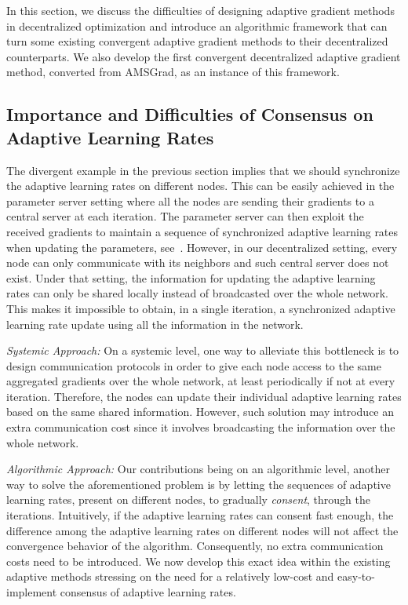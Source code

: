 \documentclass{article} %
\begin{document}
In this section, we discuss the difficulties of designing adaptive gradient methods in decentralized optimization and introduce an algorithmic framework that can turn some existing convergent adaptive gradient methods to their decentralized counterparts. 
We also develop the first convergent decentralized adaptive gradient method, converted from AMSGrad, as an instance of this  framework.

\vspace{-0.05in}
\subsection{Importance and Difficulties of Consensus on Adaptive Learning Rates}
\vspace{-0.05in}

The divergent example in the previous section implies that we should synchronize the adaptive learning rates on different nodes. 
This can be easily achieved in the parameter server setting where all the nodes are sending their gradients to a central server at each iteration.
The parameter server can then exploit the received gradients to maintain a sequence of synchronized adaptive learning rates when updating the parameters, see~\citet{reddi2020adaptive}.
However, in our decentralized setting, every node can only communicate with its neighbors and such central server does not exist.
Under that setting, the information for updating the adaptive learning rates can only be shared locally instead of broadcasted over the whole network.
This makes it impossible to obtain, in a single iteration, a synchronized adaptive learning rate update using all the information in the network. 

\textit{Systemic Approach:} 
On a systemic level, one way to alleviate this bottleneck is to design communication protocols in order to give each node access to the same aggregated gradients over the whole network, at least periodically if not at every iteration.
Therefore, the nodes can update their individual adaptive learning rates based on the same shared information. 
However, such solution may introduce an extra communication cost since it involves broadcasting the information over the whole network.

\textit{Algorithmic Approach:} 
Our contributions being on an algorithmic level, another way to solve the aforementioned problem is by letting the sequences of adaptive learning rates, present on different nodes, to gradually \emph{consent}, through the iterations. 
Intuitively, if the adaptive learning rates can consent fast enough, the difference among the adaptive learning rates on different nodes will not affect the convergence behavior of the algorithm.  
Consequently, no extra communication costs need to be introduced.
We now develop this exact idea within the existing adaptive methods stressing on the need for a relatively low-cost and easy-to-implement consensus of adaptive learning rates. 
\end{document}

